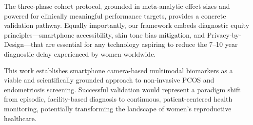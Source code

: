 \documentclass[conference]{IEEEtran}
\begin{document}
The three-phase cohort protocol, grounded in meta-analytic effect sizes and powered for clinically meaningful performance targets, provides a concrete validation pathway. Equally importantly, our framework embeds diagnostic equity principles---smartphone accessibility, skin tone bias mitigation, and Privacy-by-Design---that are essential for any technology aspiring to reduce the 7--10 year diagnostic delay experienced by women worldwide.

This work establishes smartphone camera-based multimodal biomarkers as a viable and scientifically grounded approach to non-invasive PCOS and endometriosis screening. Successful validation would represent a paradigm shift from episodic, facility-based diagnosis to continuous, patient-centered health monitoring, potentially transforming the landscape of women's reproductive healthcare.



\end{document}
